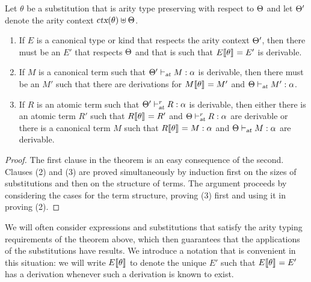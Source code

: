 \begin{theorem}\label{th:aritysubs}
Let $\theta$ be a substitution that is arity type preserving with
respect to $\Theta$ and let $\Theta'$ denote the arity context 
$\mbox{\sl ctx}(\theta) \uplus \Theta$. 
%
\begin{enumerate}
\item If $E$ is a canonical type or kind that respects the
  arity context $\Theta'$, then there must be an $E'$ that
  respects $\Theta$ and that is such that $E\llbracket {\theta} \rrbracket_{} = E'$
  is derivable. 

\item If $M$ is a canonical term such that
$\Theta' \vdash_{\mbox{\sl \scriptsize at}} M : \alpha$ is
derivable, then there must be an $M'$ such that there are derivations
for $M\llbracket {\theta} \rrbracket_{} = M'$ and $\Theta \vdash_{\mbox{\sl \scriptsize at}} M' : \alpha$.

\item If $R$ is an atomic term such that
  $\Theta' \vdash^r_{\mbox{\sl\scriptsize at}} R : \alpha$
  is derivable, then either there is an atomic term $R'$ such that
  $R\llbracket {\theta} \rrbracket_{} = R'$ and $\Theta \vdash^r_{\mbox{\sl\scriptsize at}} R : \alpha$ are
  derivable or there is a canonical term $M$ such that
  $R\llbracket {\theta} \rrbracket_{} = M : \alpha$ and
  $\Theta \vdash_{\mbox{\sl \scriptsize at}} M : \alpha$ are derivable. 
\end{enumerate}
\end{theorem}
\begin{proof}
The first clause in the theorem is an easy consequence of the
second. Clauses (2) and (3) are proved simultaneously by induction
first on the sizes of substitutions and then on the structure of
terms.
% 
The argument proceeds by considering the cases for the term structure,
proving (3) first and using it in proving (2). 
\end{proof}

We will often consider expressions and substitutions that satisfy the
arity typing requirements of the theorem above, which then guarantees
that the applications of the substitutions have results.  
%
We introduce a notation that is convenient in this situation: we will
write $E\llbracket {\theta} \rrbracket$ to denote the unique $E'$ such that
$E\llbracket {\theta} \rrbracket_{} = E'$ has a derivation whenever such a derivation is
known to exist.



